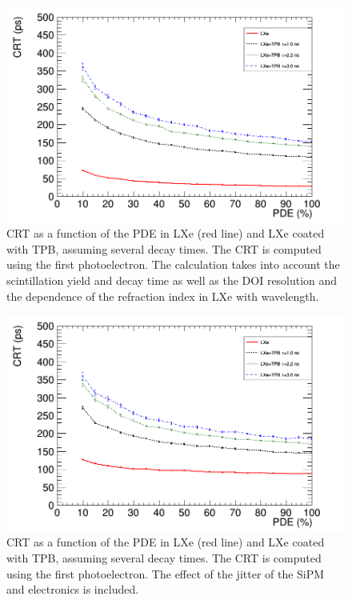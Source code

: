 \documentclass[11pt,a4paper]{article}
\begin{document}
\begin{figure}[!bhtp]
	\centering
	\includegraphics[scale=0.4]{img/tpb_decays_pde_500ps.png}
	\caption{\label{fig.crtTPB} CRT as a function of the PDE in LXe (red line) and LXe coated  with TPB, assuming several decay times. The CRT is computed using the first photoelectron. The calculation takes into account the scintillation yield and decay time as well as the DOI resolution and the dependence of the refraction index in LXe with wavelength. }
\end{figure}

\begin{figure}[!bhtp]
	\centering
	\includegraphics[scale=0.4]{img/tpb_decays_jitter_500ps.png}
	\caption{\label{fig.crtTPBjit} CRT as a function of the PDE in LXe (red line) and LXe coated  with TPB, assuming several decay times. The CRT is computed using the first photoelectron. The effect of the jitter of the SiPM and electronics is included. }
\end{figure}
\end{document}
